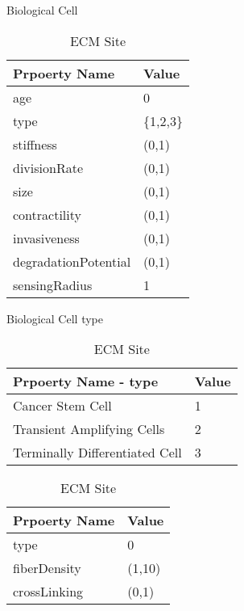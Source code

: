 \documentclass[a4paper,10pt]{article}
\begin{document}
\begin{table}[!htb]



    \begin{minipage}{.5\textwidth}
        \centering
        \caption{Biological Cell}

	  \begin{tabular}{|l|l|}
	  \hline
	  Prpoerty Name & Value \\ \hline
	  age & %
	  0 \\ \hline
	  type & \{1,2,3\} \\ \hline
	  stiffness  & (0,1) \\ \hline
	  divisionRate  & (0,1) \\ \hline
	  size  & (0,1) \\ \hline
	  contractility  & (0,1) \\ \hline
	  invasiveness  & (0,1) \\ \hline
	  degradationPotential & (0,1) \\ \hline
	  sensingRadius & 1\\ \hline
	  \end{tabular}
        
    \end{minipage}%
    \begin{minipage}{.5\textwidth}
    
	\above
	
        \centering
        \caption{Biological Cell type}
                
	  \begin{tabular}{|l|l|}
	  \hline
	  Prpoerty Name - type & Value \\ \hline
	  Cancer Stem Cell & 1 \\ \hline
	  Transient Amplifying Cells & 2 \\ \hline
	  Terminally Differentiated Cell  & 3 \\ \hline
	  \end{tabular}        

	\centering
        \caption{ECM Site}	  	  
	  \begin{tabular}{|l|l|}
	  \hline
	  Prpoerty Name & Value \\ \hline
	  type & 0\\ \hline
	  fiberDensity  & (1,10)\\ \hline
	  crossLinking  & (0,1)\\ \hline
	  \end{tabular}

        
        
    \end{minipage}
\end{table}
\end{document}
